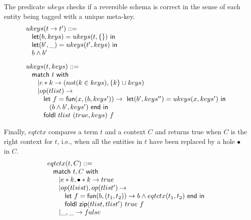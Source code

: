\documentclass{article}[12pt,a4paper]
\theoremstyle{definition}
\begin{document}
The predicate $ukeys$ checks if a reversible schema is correct in the sense of
each entity being tagged with a unique meta-key.
\[
  \begin{array}{l}
    \begin{array}{l}
      ukeys(t\rightarrow t') ::=\\
      \hspace{2ex} \mathsf{let}(b,keys)=ukeys(t, \{\})~\mathsf{in}\\
      \hspace{2ex} \mathsf{let}(b',\_)=ukeys(t', keys)~\mathsf{in}\\
      \hspace{2ex} b \wedge b'
    \end{array}\\[6ex]

    \begin{array}{l}
      ukeys(t, keys) ::=\\
      \hspace{2ex}\mathsf{match}~t~\mathsf{with}\\
      \hspace{4ex}| e*k \rightarrow (not(k\in keys), \{k\}\cup keys)\\
      \hspace{4ex}| op(tlist) \rightarrow \\
      \hspace{6ex} \mathsf{let}~f=\mathsf{fun}(x,( b, keys'))\rightarrow~\mathsf{let}(b',
      keys'') = ukeys(x,keys')~\mathsf{in}\\
      \hspace{8ex} (b\wedge b', keys')~\mathsf{end}~\mathsf{in}\\
      \hspace{6ex} \mathsf{foldl}~tlist~(true, keys)~f
    \end{array}
  \end{array}
\]

Finally, $eqtctx$ compares a term $t$ and a context $C$ and returns true when $C$ is the
right context for $t$, i.e., when all the entities in $t$ have been replaced by a
hole $\bullet$ in $C$.
\[
  \begin{array}{l}      
    eqtctx(t,C) ::=\\
    \hspace{2ex}\mathsf{match}~t,C~\mathsf{with}\\
    \hspace{4ex}| e*k, \bullet *k \rightarrow true\\
    \hspace{4ex}| op(tlsist), op(tlist') \rightarrow \\
    \hspace{6ex}\mathsf{let}~f=\mathsf{fun}(b,(t_1,t_2))\rightarrow b \wedge eqtctx(t_1,t_2)~\mathsf{end}~\mathsf{in}\\
    \hspace{6ex}\mathsf{foldl}~\mathsf{zip}(tlist,tlist')~true~f\\
    \hspace{4ex}| \_, \_ \rightarrow false
  \end{array}
\]
\end{document}
